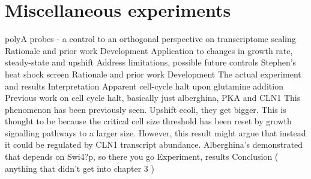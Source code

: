 
\chapter{Miscellaneous experiments}

 polyA probes - a control to an
orthogonal perspective on transcriptome scaling Rationale and prior
work Development Application to changes in growth rate, steady-state
and upshift Address limitations, possible future controls Stephen’s
heat shock screen Rationale and prior work Development The actual
experiment and results Interpretation Apparent cell-cycle halt upon
glutamine addition Previous work on cell cycle halt, basically just
alberghina, PKA and CLN1 This phenomenon has been previously seen.
Upshift ecoli, they get bigger.  This is thought to be because the
critical cell size threshold has been reset by growth signalling
pathways to a larger size. However, this result might argue that
instead it could be regulated by CLN1 transcript abundance.
Alberghina’s demonstrated that depends on Swi4?p, so there you go
Experiment, results Conclusion ( anything that didn’t get into chapter
3 )

